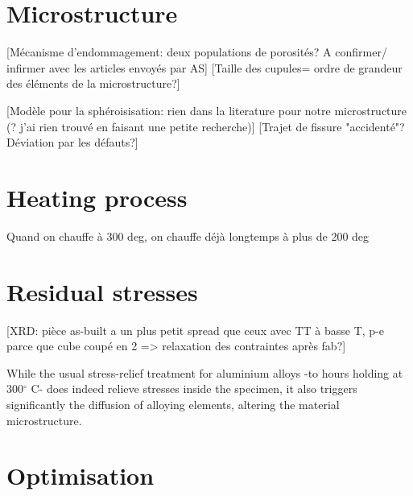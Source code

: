 \section{Microstructure}

[Mécanisme d'endommagement: deux populations de porosités? A confirmer/ infirmer avec les articles envoyés par AS]
[Taille des cupules= ordre de grandeur des éléments de la microstructure?] 

[Modèle pour la sphéroisisation: rien dans la literature pour notre microstructure (? j'ai rien trouvé en faisant une petite recherche)]
[Trajet de fissure "accidenté"? Déviation par les défauts?]
\section{Heating process}
Quand on chauffe à 300 deg, on chauffe déjà longtemps à plus de 200 deg

\section{Residual stresses}

[XRD: pièce as-built a un plus petit spread que ceux avec TT à basse T, p-e parce que cube coupé en 2 => relaxation des contraintes après fab?]

While the usual stress-relief treatment for aluminium alloys -to hours holding at 300$^\circ$ C- does indeed relieve stresses inside the specimen, it also triggers significantly the diffusion of alloying elements, altering the material microstructure.




\label{D-MP}

\section{Optimisation}




